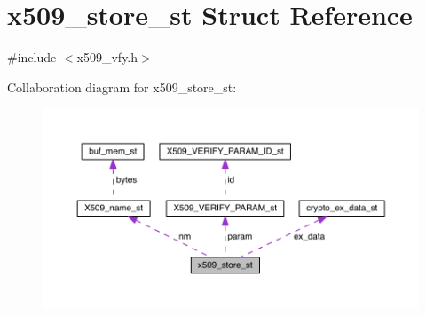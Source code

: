 \hypertarget{structx509__store__st}{}\section{x509\+\_\+store\+\_\+st Struct Reference}
\label{structx509__store__st}


{\ttfamily \#include $<$x509\+\_\+vfy.\+h$>$}



Collaboration diagram for x509\+\_\+store\+\_\+st\+:\nopagebreak
\begin{figure}[H]
\begin{center}
\leavevmode
\includegraphics[width=350pt]{structx509__store__st__coll__graph}
\end{center}
\end{figure}
